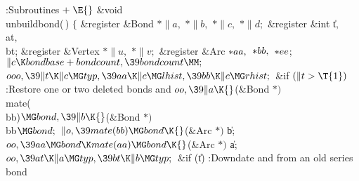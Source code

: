 \Y\B\4:Subroutines\X${}\mathrel+\E{}$\6
\&{void} \\{unbuildbond}(\,)\1\1\2\2\6
${}\{{}$\1\6
\&{register} \&{Bond} ${}{*}\|a,{}$ ${}{*}\|b,{}$ ${}{*}\|c,{}$ ${}{*}\|d;{}$\6
\&{register} \&{int} \|t${},{}$ \\{at}${},{}$ \\{bt};\6
\&{register} \&{Vertex} ${}{*}\|u,{}$ ${}{*}\|v;{}$\6
\&{register} \&{Arc} ${}{*}\\{aa},{}$ ${}{*}\\{bb},{}$ ${}{*}\\{ee}{}$;\7
${}\|c\K\\{bondbase}+\\{bondcount},\39\\{bondcount}\MM;{}$\6
${}\\{ooo},\39\|t\K\|c\MG\\{typ},\39\\{aa}\K\|c\MG\\{lhist},\39\\{bb}\K\|c\MG%
\\{rhist};{}$\6
\&{if} ${}(\|t>\T{1}){}$\1\5
:Restore one or two deleted bonds and \X\2\6
${}\\{oo},\39\|a\K{}$(\&{Bond} ${}{*}){}$ \\{mate}(\\{bb})${}\MG\\{bond},\39\|b%
\K{}$(\&{Bond} ${}{*}){}$ \\{bb}${}\MG\\{bond};{}$\6
${}\|o,\39\\{mate}(\\{bb})\MG\\{bond}\K{}$(\&{Arc} ${}{*}){}$ \|b;\6
${}\\{oo},\39\\{aa}\MG\\{bond}\K\\{mate}(\\{aa})\MG\\{bond}\K{}$(\&{Arc}
${}{*}){}$ \|a;\6
${}\\{oo},\39\\{at}\K\|a\MG\\{typ},\39\\{bt}\K\|b\MG\\{typ};{}$\6
\&{if} (\|t)\1\5
:Downdate  and  from an old series bond\X\2\6
